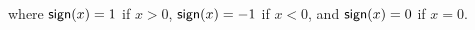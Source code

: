 \begin{proposition}
\begin{comment}
\begin{align}
\begin{split}\label{eq:edges-inference}
  \forall b\in\PHpredecgene{a}, \forall s \in \{ +, - \}, \\
  b \xrightarrow{t+1} a \in \hat{E}_s \Longleftrightarrow\ & \exists g \in X(a), b \in g,
  \exists \sigma \in \textstyle\prod_{c\in g \cup \{ a \}} \PHl_c, \\
    &\qquad \{ b_t, b_{t+1} \} \subset \PHl_b \wedge b_t \in \sigma,\\
    &\qquad \exists a_j \in \irB_a(\sigma), \exists a_k \in \irB_a(\sigma\{b_{t+1}\}), \\
    &\qquad s = \f{sign}(k - a)
\end{split}
\end{align}
\begin{align}
\begin{split}\label{eq:edges-inference-auto}
  \forall s \in \{ +, - \}, \quad\qquad\qquad \\
  a \xrightarrow{t+1} a \in \hat{E}_s \Longleftrightarrow\ & \exists g \in X(a), \exists b \in g,
  \exists \sigma \in \textstyle\prod_{c\in g \cup \{ a \}} \PHl_c, \\
    &\qquad \{ b_t, b_{t+1} \} \subset \PHl_b \wedge b_t \in \sigma,\\
    &\qquad \exists a_j \in \irB_a(\sigma), \exists a_k \in \irB_a(\sigma\{b_{t+1}\}), \\
    &\qquad s = \f{sign}(a_k - a_j)
\end{split}
\end{align}
\begin{align}
\begin{split}\label{eq:edges-inference-noreg}
  \forall s \in \{ +, - \}, \quad\qquad\qquad \\
  a \xrightarrow{t+1} a \in \hat{E}_s \Longleftrightarrow\ & \reg{a} = \emptyset \wedge \{ a_t, a_{t+1} \} \subset \PHl_a, \\
    &\qquad \exists a_j \in \irB_a(\PHetat{a_t}), \exists a_k \in \irB_a(\PHetat{a_{t+1}}), \\
    &\qquad s = \f{sign}(a_k - a_j)
\end{split}
\end{align}
\end{comment}
where $\mathsf{sign}(x) = 1$ if $x>0$, $\mathsf{sign}(x) = -1$ if $x < 0$, and
$\mathsf{sign}(x) = 0$ if $x=0$.
\end{proposition}

